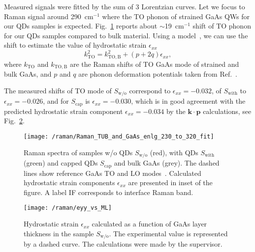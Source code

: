 Measured signals were fitted by the sum of 3 Lorentzian curves.
Let we focus to Raman signal around 290~cm$^{-1}$ where the TO phonon of strained GaAs QWs for our QDs samples is expected. Fig.~\ref{fig:raman} reports about $\sim$19~cm$^{-1}$ shift of TO phonon for our QDs samples compared to bulk material. Using a model~\cite{Montazeri_Nano2010}, we can use the shift to estimate the value of hydrostatic strain $\epsilon_{xx}$ 
\begin{equation}
k_\mathrm{TO}^2 = k_\mathrm{TO,B}^2 + (p+2q)\epsilon_{xx},
\end{equation}
where $k_\mathrm{TO}$ and $k_\mathrm{TO,B}$ are the Raman shifts of TO GaAs mode of strained and bulk GaAs, and $p$ and $q$ are phonon deformation potentials taken from Ref.~\cite{Cerdeira_PRB1972}.

The measured shifts of TO mode of $S_\mathrm{w/o}$ correspond to $\epsilon_{xx}=-0.032$, of $S_\mathrm{with}$ to $\epsilon_{xx}=-0.026$,  and for $S_\mathrm{cap}$ is $\epsilon_{xx}=-0.030$, which is in good agreement with the predicted hydrostatic strain component $\epsilon_{xx}=-0.034$ by the $\mathbf{k \cdot p}$ calculations, see Fig.~\ref{fig:raman_theory_wo}. %
\begin{figure}
	\centering
	\texttt{[image: /raman/Raman\_TUB\_and\_GaAs\_enlg\_230\_to\_320\_fit]}
	\caption{Raman spectra of samples w/o QDs $S_\mathrm{w/o}$ (red), with QDs $S_\mathrm{with}$ (green) and capped QDs $S_\mathrm{cap}$ and bulk GaAs (grey). The dashed lines show reference GaAs TO and LO modes~\citep{Esther_Nanotech2013}. Calculated hydrostatic strain components $\epsilon_{xx}$ are presented in inset of the figure. A label IF corresponds to interface Raman band.}
	\label{fig:raman}
\end{figure}

\begin{figure}
	\centering
	\texttt{[image: /raman/eyy\_vs\_ML]}
	\caption{Hydrostatic strain $\epsilon_{xx}$ calculated as a function of GaAs layer thickness in the sample $S_\mathrm{w/o}$. The experimental value is represented by a dashed curve. The calculations were made by the supervisor.}
	\label{fig:raman_theory_wo}
\end{figure}


\clearpage
